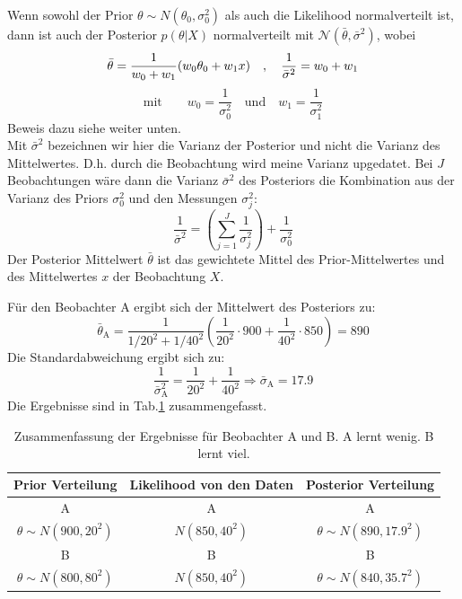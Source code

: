 Wenn sowohl der Prior $\theta \sim N(\theta_0,\sigma_0^2)$ als auch die
Likelihood normalverteilt ist, dann ist auch der Posterior $p(\theta|X)$ normalverteilt mit $\mathcal{N}(\bar{\theta},\bar{\sigma}^2)$, wobei
\begin{equation}
\bar{\theta} = \frac{1}{w_0+w_1}(w_0 \theta_0 + w_1 x)\quad, \quad
\frac{1}{\bar{\sigma}^2}=w_0 + w_1 \\
\label{eq:prior_Normal}
\end{equation}
\[
\mathrm{mit} \quad \quad w_0 = \frac{1}{\sigma_0^2} \quad \mathrm{und} \quad w_1=\frac{1}{\sigma_1^2}
\]
Beweis dazu siehe weiter unten. \\
Mit $\bar{\sigma}^2$ bezeichnen wir hier die Varianz der Posterior
und nicht die Varianz des Mittelwertes. D.h. durch die Beobachtung
wird meine Varianz upgedatet. Bei $J$ Beobachtungen wäre dann die Varianz $\bar{\sigma}^2$ des Posteriors die Kombination aus der
Varianz des Priors $\sigma_0^2$ und den Messungen $\sigma_j^2$:
\[
\frac{1}{\bar{\sigma}^2} = \left( \sum_{j=1}^{J}
\frac{1}{\sigma_j^2}\right) + \frac{1}{\sigma_0^2}
\]
Der Posterior Mittelwert $\bar{\theta}$ ist das gewichtete Mittel des Prior-Mittelwertes
und des Mittelwertes $x$ der Beobachtung $X$.

Für den Beobachter A ergibt sich der Mittelwert des Posteriors zu:
\[
\bar{\theta}_\mathrm{A} = \frac{1}{1/20^2+1/40^2}\left( \frac{1}{20^2}\cdot 900 +
 \frac{1}{40^2}\cdot 850  \right) = 890
\]
Die Standardabweichung ergibt sich zu:
\[
\frac{1}{\bar{\sigma}_\mathrm{A}^2}=\frac{1}{20^2} + \frac{1}{40^2} \Rightarrow
\bar{\sigma}_\mathrm{A} = 17.9
\]
Die Ergebnisse sind in Tab.\ref{tab:Ergebnisse des Beispiels} zusammengefasst.
\begin{table}[!h]
	\caption{Zusammenfassung der Ergebnisse für Beobachter A und B. A lernt
	wenig. B lernt viel.}
	\centering
	\begin{tabular}{c c c}  \hline
		Prior Verteilung & Likelihood von den Daten & Posterior Verteilung\\
		\hline
		A & A & A \\
		$\theta \sim N(900, 20^2)$ &$N(850,40^2)$ & $\theta \sim N(890, 17.9^2)$ \\
		B &B & B \\
		$\theta \sim N(800, 80^2)$ &$N(850,40^2)$ & $\theta \sim N(840, 35.7^2)$ \\
		\hline
	\end{tabular}
	\label{tab:Ergebnisse des Beispiels}
\end{table}

